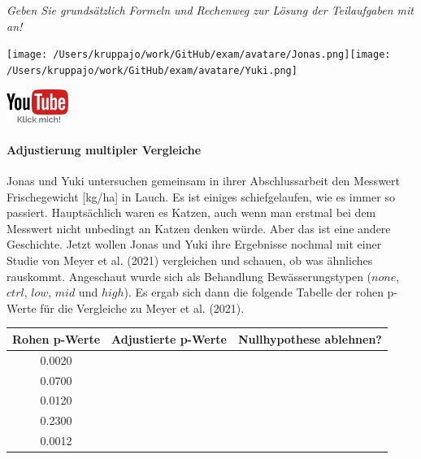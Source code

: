 \documentclass[a4paper, 9pt]{scrartcl}\usepackage[]{graphicx}\usepackage[]{xcolor}
\newenvironment{knitrout}{}{} %
\begin{document}
\textit{Geben Sie grundsätzlich Formeln und Rechenweg zur Lösung der Teilaufgaben mit an!} \\[1Ex]
 

 
\begin{minipage}[t]{0.5\textwidth}
\texttt{[image: /Users/kruppajo/work/GitHub/exam/avatare/Jonas.png]}\hspace{-4mm}\texttt{[image: /Users/kruppajo/work/GitHub/exam/avatare/Yuki.png]}
\end{minipage}
\begin{minipage}[t]{0.5\textwidth}
\hfill
\href{https://youtu.be/kHmfEmU6lrk}{\includegraphics[width = 2cm]{img/youtube}}
\end{minipage}



\paragraph{Adjustierung multipler Vergleiche}

Jonas und Yuki untersuchen gemeinsam in ihrer Abschlussarbeit den Messwert Frischegewicht [kg/ha] in Lauch. Es ist einiges schiefgelaufen, wie es immer so passiert. Hauptsächlich waren es Katzen, auch wenn man erstmal bei dem Messwert nicht unbedingt an Katzen denken würde. Aber das ist eine andere Geschichte. Jetzt wollen Jonas und Yuki ihre Ergebnisse nochmal mit einer Studie von Meyer et al. (2021) vergleichen und schauen, ob was ähnliches rauskommt. Angeschaut wurde sich als Behandlung Bewässerungstypen ($none$, $ctrl$, $low$, $mid$ und $high$). Es ergab sich dann die folgende Tabelle der rohen p-Werte für die Vergleiche zu Meyer et al. (2021).

\begin{knitrout}
\color{fgcolor}\begin{table}[!h]
\centering\begingroup\fontsize{10}{12}\selectfont

\begin{tabular}{ccc}
\toprule
\textbf{Rohen p-Werte} & \textbf{Adjustierte p-Werte} & \textbf{Nullhypothese ablehnen?}\\
\midrule
0.0020 &  & \\
0.0700 &  & \\
0.0120 &  & \\
0.2300 &  & \\
0.0012 &  & \\
\bottomrule
\end{tabular}
\endgroup{}
\end{table}

\end{knitrout}
\end{document}
